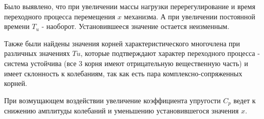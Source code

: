 \documentclass[a4paper,12pt]{article}
\begin{document}
	\par
	Было выявлено, что при увеличении массы нагрузки перерегулирование и время переходного процесса перемещения $x$ механизма. А при увеличении постоянной времени $T_u$ - наоборот. Установившееся значение остается неизменным.
	\par
	Также были найдены значения корней характеристического многочлена при различных значениях $Tu$, которые подтверждают характер переходного процесса - система устойчива (все 3 корня имеют отрицательную вещественную часть) и имеет склонность к колебаниям, так как есть пара комплексно-сопряженных корней.
	\par
	При возмущающем воздействии увеличение коэффициента упругости $C_p$ ведет к снижению амплитуды колебаний и уменьшению установившегося значения $x$. 
	
\end{document}
